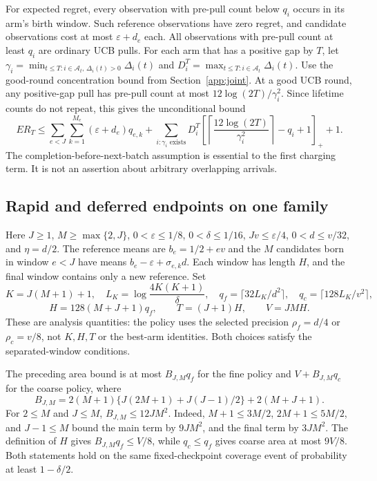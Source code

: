 For expected regret, every observation with pre-pull count below $q_i$
occurs in its arm's birth window. Such reference observations have zero
regret, and candidate observations cost at most $\varepsilon+d_e$ each.
All observations with pre-pull count at least $q_i$ are ordinary UCB pulls.
For each arm that has a positive gap by $T$, let
$\gamma_i=\min_{t\le T:i\in\mathcal A_t,\,\Delta_i(t)>0}\Delta_i(t)$
and $D_i^T=\max_{t\le T:i\in\mathcal A_t}\Delta_i(t)$.
Use the good-round concentration bound from Section~\ref{app:joint}. At a good UCB round, any positive-gap
pull has pre-pull count at most $12\log(2T)/\gamma_i^2$. Since lifetime counts do not
repeat, this gives the unconditional bound
\begin{equation}
\label{eq:app_reuse_regret}
 ER_T\le\sum_{e<J}\sum_{k=1}^{M_e}(\varepsilon+d_e)q_{e,k}
 +\sum_{i:\gamma_i\text{ exists}}D_i^T
 \left[\left\lceil\frac{12\log(2T)}{\gamma_i^2}\right\rceil-q_i+1\right]_+
 +1.
\end{equation}
The completion-before-next-batch assumption is essential to the first
charging term. It is not an assertion about arbitrary overlapping arrivals.

\subsection{Rapid and deferred endpoints on one family}
\label{app:tradeoff}

Here $J\ge1$, $M\ge\max\{2,J\}$,
$0<\varepsilon\le1/8$, $0<\delta\le1/16$, $Jv\le\varepsilon/4$,
$0<d\le v/32$, and $\eta=d/2$. The reference means are
$b_e=1/2+ev$ and the $M$ candidates born in window $e<J$ have means
$b_e-\varepsilon+\sigma_{e,k}d$. Each window has length $H$, and the final
window contains only a new reference. Set
\[
 K=J(M+1)+1,\quad L_K=\log\frac{4K(K+1)}\delta,
 \quad q_f=\lceil32L_K/d^2\rceil,\quad q_c=\lceil128L_K/v^2\rceil,
\]
\[
 H=128(M+J+1)q_f,\qquad T=(J+1)H,\qquad V=JMH.
\]
These are analysis quantities: the policy uses the selected precision
$\rho_f=d/4$ or $\rho_c=v/8$, not $K,H,T$ or the best-arm identities.
Both choices satisfy the separated-window conditions.

The preceding area bound is at most $B_{J,M}q_f$ for the fine policy and
$V+B_{J,M}q_c$ for the coarse policy, where
\[
 B_{J,M}=2(M+1)\{J(2M+1)+J(J-1)/2\}+2(M+J+1).
\]
For $2\le M$ and $J\le M$, $B_{J,M}\le12JM^2$. Indeed,
$M+1\le3M/2$, $2M+1\le5M/2$, and $J-1\le M$ bound the main term by
$9JM^2$, and the final term by $3JM^2$. The definition of $H$ gives
$B_{J,M}q_f\le V/8$, while $q_c\le q_f$ gives coarse area at most $9V/8$.
Both statements hold on the same fixed-checkpoint coverage event of
probability at least $1-\delta/2$.

